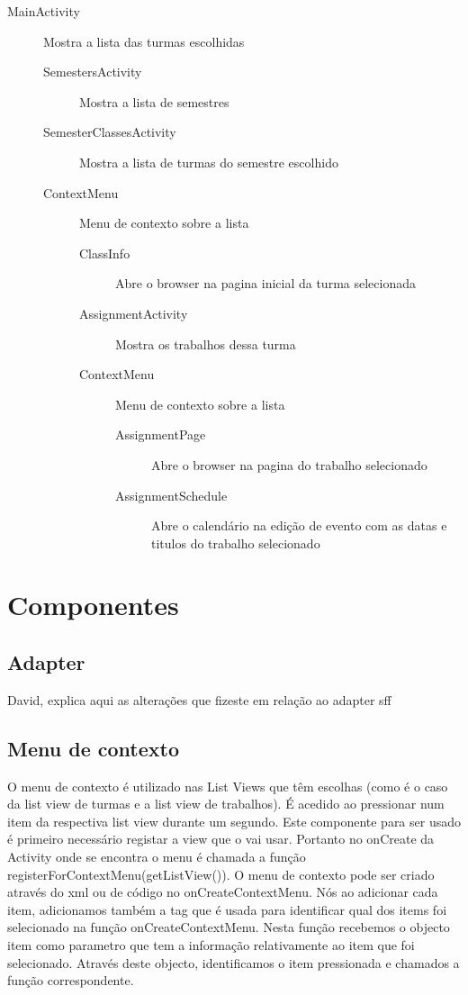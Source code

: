\documentclass{article}
\begin{document}
\begin{description}
	\item[MainActivity] Mostra a lista das turmas escolhidas
		\begin{description}
			\item[SemestersActivity] Mostra a lista de semestres
			\item[SemesterClassesActivity] Mostra a lista de turmas do semestre escolhido
			\item[ContextMenu] Menu de contexto sobre a lista
			\begin{description}			
				\item[ClassInfo] Abre o browser na pagina inicial da turma selecionada
				\item[AssignmentActivity] Mostra os trabalhos dessa turma
				\item[ContextMenu] Menu de contexto sobre a lista
				\begin{description}											
					\item[AssignmentPage] Abre o browser na pagina do trabalho selecionado
					\item[AssignmentSchedule] Abre o calendário na edição de evento com as datas e titulos do trabalho selecionado
				\end{description}
			\end{description}
		\end{description}
\end{description}
					

\section{Componentes}

\subsection{Adapter}

David, explica aqui as alterações que fizeste em relação ao adapter sff

\subsection{Menu de contexto}
O menu de contexto é utilizado nas List Views que têm escolhas (como é o caso da list view de turmas e a list view de trabalhos). É acedido ao pressionar num item da respectiva list view durante um segundo.
Este componente para ser usado é primeiro necessário registar a view que o vai usar. Portanto no onCreate da Activity onde se encontra o menu é chamada a função registerForContextMenu(getListView()).
O menu de contexto pode ser criado através do xml ou de código no onCreateContextMenu. Nós ao adicionar cada item, adicionamos também a tag que é usada para identificar qual dos items foi selecionado na função
onCreateContextMenu. Nesta função recebemos o objecto item como parametro que tem a informação relativamente ao item que foi selecionado. Através deste objecto, identificamos o item pressionada e 
chamados a função correspondente.
\end{document}
